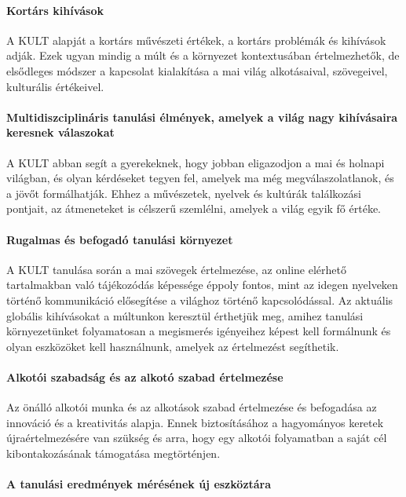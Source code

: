 \paragraph{Kortárs kihívások}

A KULT alapját a kortárs művészeti értékek, a kortárs problémák és kihívások adják. Ezek ugyan mindig a múlt és a környezet kontextusában értelmezhetők, de elsődleges módszer a kapcsolat kialakítása a mai világ alkotásaival, szövegeivel, kulturális értékeivel.

\paragraph{Multidiszciplináris tanulási élmények, amelyek a világ nagy kihívásaira keresnek válaszokat}

A KULT abban segít a gyerekeknek, hogy jobban eligazodjon a mai és holnapi világban, és olyan kérdéseket tegyen fel, amelyek ma még megválaszolatlanok, és a jövőt formálhatják. Ehhez a művészetek, nyelvek és kultúrák találkozási pontjait, az átmeneteket is célszerű szemlélni, amelyek a világ egyik fő értéke.

\paragraph{Rugalmas és befogadó tanulási környezet}

A KULT tanulása során a mai szövegek értelmezése, az online elérhető tartalmakban való tájékozódás képessége éppoly fontos, mint az idegen nyelveken történő kommunikáció elősegítése a világhoz történő kapcsolódással. Az aktuális globális kihívásokat a múltunkon keresztül érthetjük meg, amihez tanulási környezetünket folyamatosan a megismerés igényeihez képest kell formálnunk és olyan eszközöket kell használnunk, amelyek az értelmezést segíthetik.

\paragraph{Alkotói szabadság és az alkotó szabad értelmezése}

Az önálló alkotói munka és az alkotások szabad értelmezése és befogadása az innováció és a kreativitás alapja. Ennek biztosításához a hagyományos keretek újraértelmezésére van szükség és arra, hogy egy alkotói folyamatban a saját cél kibontakozásának támogatása megtörténjen.

\paragraph{A tanulási eredmények mérésének új eszköztára}

